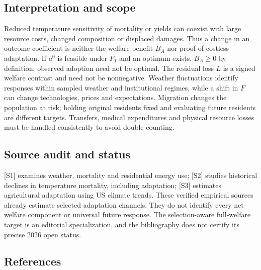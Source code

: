 \documentclass[11pt,a4paper]{article}
\begin{document}
\subsection*{Interpretation and scope}

Reduced temperature sensitivity of mortality or yields can coexist with large resource costs, changed composition or displaced damages. Thus a change in an outcome coefficient is neither the welfare benefit $B_A$ nor proof of costless adaptation. If $a^0$ is feasible under $F_1$ and an optimum exists, $B_A\ge0$ by definition; observed adoption need not be optimal. The residual loss $L$ is a signed welfare contrast and need not be nonnegative. Weather fluctuations identify responses within sampled weather and institutional regimes, while a shift in $F$ can change technologies, prices and expectations. Migration changes the population at risk; holding original residents fixed and evaluating future residents are different targets. Transfers, medical expenditures and physical resource losses must be handled consistently to avoid double counting.

\subsection*{Source audit and status}

[S1] examines weather, mortality and residential energy use; [S2] studies historical declines in temperature mortality, including adaptation; [S3] estimates agricultural adaptation using US climate trends. These verified empirical sources already estimate selected adaptation channels. They do not identify every net-welfare component or universal future response. The selection-aware full-welfare target is an editorial specialization, and the bibliography does not certify its precise 2026 open status.

\subsection*{References}
\end{document}
